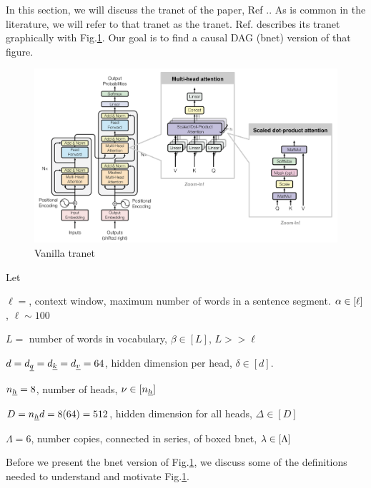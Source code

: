 In this section, we
will discuss
 the tranet of
 the  paper, Ref
 .\cite{attention-is-all-you-need}.
 As is common in the literature,
 we will refer to that tranet as
 the  tranet.
 Ref.\cite{attention-is-all-you-need} describes its tranet
 graphically with Fig.\ref{fig-vanilla-transformer}.
 Our goal
 is to find a causal DAG (bnet)
 version of that figure.

\begin{figure}[!h]
\centering
\includegraphics[width=6in]
{transformer/transformer.png}
\caption{Vanilla tranet}
\label{fig-vanilla-transformer}
\end{figure}

Let

$\ell=$, context window, maximum number of words in a sentence segment. $\alpha\in [\ell]$, $\ell\sim 100$

$L=$ number of words in vocabulary, $\beta\in[L]$, $L>> \ell$

$d=d_\rvq=d_\rvk=d_\rvv=64$, hidden dimension  per head,
$\delta\in[d]$.

$n_\rvh=8$, number of heads, $\nu \in[n_\rvh]$

$D=n_\rvh d=8(64)=512$, hidden dimension for all heads,
$\Delta\in [D]$

$\Lambda=6$, number copies,
connected in series,
of boxed bnet, $\lambda\in[\Lambda]$



Before we present the bnet
version of Fig.\ref{fig-vanilla-transformer},
we discuss some of the
definitions needed to
understand and motivate
 Fig.\ref{fig-vanilla-transformer}.


